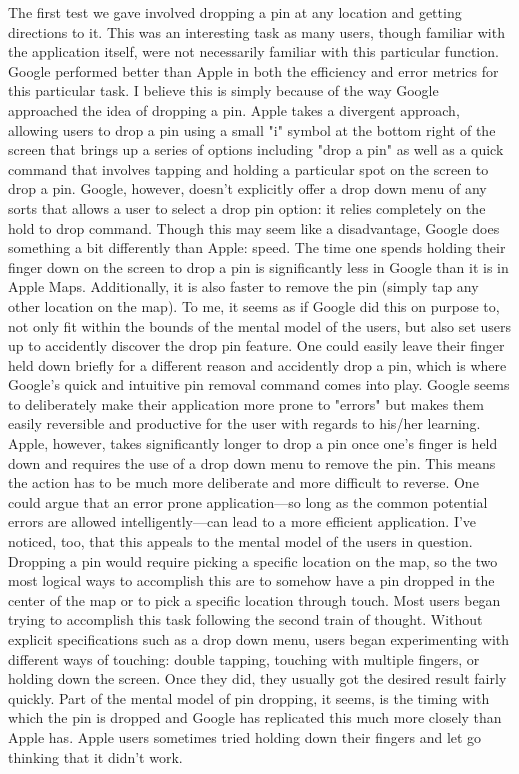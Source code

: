 The first test we gave involved dropping a pin at any location and getting directions to it. This was an interesting task as many users, though familiar with the application itself, were not necessarily familiar with this particular function. Google performed better than Apple in both the efficiency and error metrics for this particular task. I believe this is simply because of the way Google approached the idea of dropping a pin. Apple takes a divergent approach, allowing users to drop a pin using a small "i" symbol at the bottom right of the screen that brings up a series of options including "drop a pin" as well as a quick command that involves tapping and holding a particular spot on the screen to drop a pin. Google, however, doesn’t explicitly offer a drop down menu of any sorts that allows a user to select a drop pin option: it relies completely on the hold to drop command. Though this may seem like a disadvantage, Google does something a bit differently than Apple: speed. The time one spends holding their finger down on the screen to drop a pin is significantly less in Google than it is in Apple Maps. Additionally, it is also faster to remove the pin (simply tap any other location on the map). To me, it seems as if Google did this on purpose to, not only fit within the bounds of the mental model of the users, but also set users up to accidently discover the drop pin feature. One could easily leave their finger held down briefly for a different reason and accidently drop a pin, which is where Google's quick and intuitive pin removal command comes into play. Google seems to deliberately make their application more prone to "errors" but makes them easily reversible and productive for the user with regards to his/her learning. Apple, however, takes significantly longer to drop a pin once one's finger is held down and requires the use of a drop down menu to remove the pin. This means the action has to be much more deliberate and more difficult to reverse. One could argue that an error prone application—so long as the common potential errors are allowed intelligently—can lead to a more efficient application.
	 I've noticed, too, that this appeals to the mental model of the users in question. Dropping a pin would require picking a specific location on the map, so the two most logical ways to accomplish this are to somehow have a pin dropped in the center of the map or to pick a specific location through touch. Most users began trying to accomplish this task following the second train of thought. Without explicit specifications such as a drop down menu, users began experimenting with different ways of touching: double tapping, touching with multiple fingers, or holding down the screen. Once they did, they usually got the desired result fairly quickly. Part of the mental model of pin dropping, it seems, is the timing with which the pin is dropped and Google has replicated this much more closely than Apple has. Apple users sometimes tried holding down their fingers and let go thinking that it didn't work.
